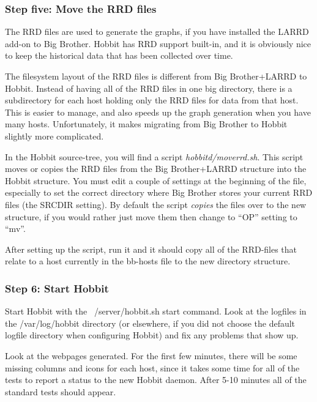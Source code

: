 \subsubsection{Step five: Move the RRD files}


 The RRD files are used to generate the graphs, if you have installed
 the LARRD add-on to Big Brother. Hobbit has RRD support built-in, and
 it is obviously nice to keep the historical data that has been
 collected over time.



 The filesystem layout of the RRD files is different from Big
 Brother+LARRD to Hobbit. Instead of having all of the RRD files in
 one big directory, there is a subdirectory for each host holding only
 the RRD files for data from that host. This is easier to manage, and
 also speeds up the graph generation when you have many
 hosts. Unfortunately, it makes migrating from Big Brother to Hobbit
 slightly more complicated.



 In the Hobbit source-tree, you will find a script
 \emph{hobbitd/moverrd.sh}. This script moves or copies the RRD files
 from the Big Brother+LARRD structure into the Hobbit structure. You
 must edit a couple of settings at the beginning of the file,
 especially to set the correct directory where Big Brother stores your
 current RRD files (the SRCDIR setting). By default the script
 \emph{copies} the files over to the new structure, if you would
 rather just move them then change to ``OP'' setting to ``mv''.


 After setting up the script, run it and it should copy all of the
 RRD-files that relate to a host currently in the bb-hosts file to the
 new directory structure.

\subsubsection{Step 6: Start Hobbit}


 Start Hobbit with the ~/server/hobbit.sh start command. Look at the
 logfiles in the /var/log/hobbit directory (or elsewhere, if you did
 not choose the default logfile directory when configuring Hobbit) and
 fix any problems that show up.



 Look at the webpages generated. For the first few minutes, there will
 be some missing columns and icons for each host, since it takes some
 time for all of the tests to report a status to the new Hobbit
 daemon. After 5-10 minutes all of the standard tests should appear.


